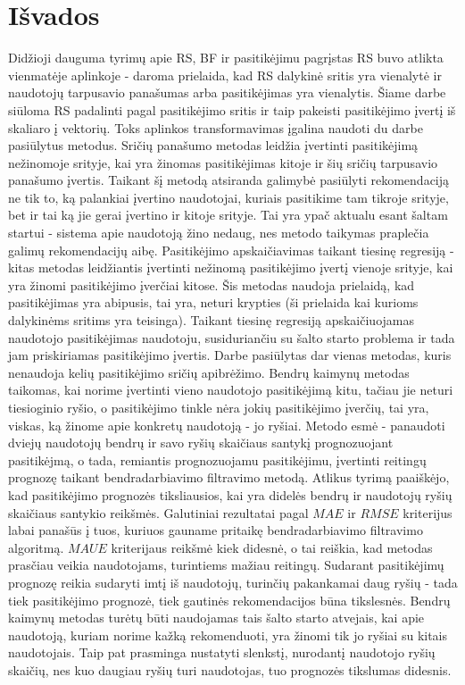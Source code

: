 \documentclass{VUMIFInfMagistrinis}
\begin{document}
\section{Išvados}
Didžioji dauguma tyrimų apie RS, BF ir pasitikėjimu pagrįstas RS buvo atlikta vienmatėje aplinkoje - daroma prielaida, kad RS dalykinė sritis yra vienalytė ir naudotojų tarpusavio panašumas arba pasitikėjimas yra vienalytis. Šiame darbe siūloma RS padalinti pagal pasitikėjimo sritis ir taip pakeisti pasitikėjimo įvertį iš skaliaro į vektorių. Toks aplinkos transformavimas įgalina naudoti du darbe pasiūlytus metodus.
\newline
\indent
Sričių panašumo metodas leidžia įvertinti pasitikėjimą nežinomoje srityje, kai yra žinomas pasitikėjimas kitoje ir šių sričių tarpusavio panašumo įvertis. Taikant šį metodą atsiranda galimybė pasiūlyti rekomendaciją ne tik to, ką palankiai įvertino naudotojai, kuriais pasitikime tam tikroje srityje, bet ir tai ką jie gerai įvertino ir kitoje srityje. Tai yra ypač aktualu esant šaltam startui - sistema apie naudotoją žino nedaug, nes metodo taikymas praplečia galimų rekomendacijų aibę.
\newline
\indent
Pasitikėjimo apskaičiavimas taikant tiesinę regresiją - kitas metodas leidžiantis įvertinti nežinomą pasitikėjimo įvertį vienoje srityje, kai yra žinomi pasitikėjimo įverčiai kitose. Šis metodas naudoja prielaidą, kad pasitikėjimas yra abipusis, tai yra, neturi krypties (ši prielaida kai kurioms dalykinėms sritims yra teisinga). Taikant tiesinę regresiją apskaičiuojamas naudotojo pasitikėjimas naudotoju, susiduriančiu su šalto starto problema ir tada jam priskiriamas pasitikėjimo įvertis.
\newline
\indent
Darbe pasiūlytas dar vienas metodas, kuris nenaudoja kelių pasitikėjimo sričių apibrėžimo. Bendrų kaimynų metodas taikomas, kai norime įvertinti vieno naudotojo pasitikėjimą kitu, tačiau jie neturi tiesioginio ryšio, o pasitikėjimo tinkle nėra jokių pasitikėjimo įverčių, tai yra, viskas, ką žinome apie konkretų naudotoją - jo ryšiai. Metodo esmė - panaudoti dviejų naudotojų bendrų ir savo ryšių skaičiaus santykį prognozuojant pasitikėjmą, o tada, remiantis prognozuojamu pasitikėjimu, įvertinti reitingų prognozę taikant bendradarbiavimo filtravimo metodą.
\newline
\indent
Atlikus tyrimą paaiškėjo, kad pasitikėjimo prognozės tiksliausios, kai yra didelės bendrų ir naudotojų ryšių skaičiaus santykio reikšmės. Galutiniai rezultatai pagal $MAE$ ir $RMSE$ kriterijus labai panašūs į tuos, kuriuos gauname pritaikę bendradarbiavimo filtravimo algoritmą. $MAUE$ kriterijaus reikšmė kiek didesnė, o tai reiškia, kad metodas prasčiau veikia naudotojams, turintiems mažiau reitingų. Sudarant pasitikėjimų prognozę reikia sudaryti imtį iš naudotojų, turinčių pakankamai daug ryšių - tada tiek pasitikėjimo prognozė, tiek gautinės rekomendacijos būna tikslesnės. Bendrų kaimynų metodas turėtų būti naudojamas tais šalto starto atvejais, kai apie naudotoją, kuriam norime kažką rekomenduoti, yra žinomi tik jo ryšiai su kitais naudotojais. Taip pat prasminga nustatyti slenkstį, nurodantį naudotojo ryšių skaičių, nes kuo daugiau ryšių turi naudotojas, tuo prognozės tikslumas didesnis.
\end{document}
